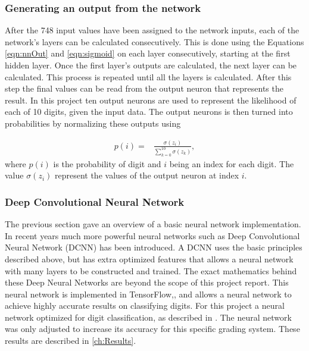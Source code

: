 \subsubsection{Generating an output from the network}
After the 748 input values have been assigned to the network inputs, each of the network's layers can be calculated consecutively. This is done using the Equations \ref{eqn:nnOut} and \ref{eqn:sigmoid} on each layer consecutively, starting at the first hidden layer. Once the first layer's outputs are calculated, the next layer can be calculated. This process is repeated until all the layers is calculated. After this step the final values can be read from the output neuron that represents the result. In this project ten output neurons are used to represent the likelihood of each of 10 digits, given the input data. The output neurons is then turned into probabilities by normalizing these outputs using


\begin{align}
  p(i) =  &\displaystyle{\frac{\sigma(z_{i})}{\sum_{k=0}^{10} \sigma(z_{k})}},
\label{eqn:normal}
\end{align}
where $p(i)$ is the probability of digit and $i$ being an index for each digit. The value $\sigma(z_{i})$ represent the values of the output neuron at index $i$.

\subsubsection{Deep Convolutional Neural Network}

The previous section gave an overview of a basic neural network implementation. In recent years much more powerful neural networks such as Deep Convolutional Neural Network (DCNN) has been introduced. A DCNN uses the basic principles described above, but has extra optimized features that allows a neural network with many layers to be constructed and trained. The exact mathematics behind these Deep Neural Networks are beyond the scope of this project report. This neural network is implemented in TensorFlow,\citet{Tensor}, and allows a neural network to achieve highly accurate results on classifying digits. For this project a neural network optimized for digit classification, as described in \citet{Tensor}. The neural network was only adjusted to increase its accuracy for this specific grading system. These results are described in \ref{ch:Results}.

